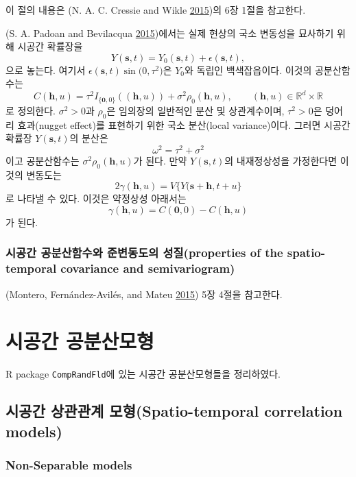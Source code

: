 \documentclass[b5paper,]{book}
\theoremstyle{definition}
\theoremstyle{definition}
\theoremstyle{definition}
\theoremstyle{remark}
\begin{document}
이 절의 내용은 (N. A. C. Cressie and Wikle
\protect\hyperlink{ref-Cressie2015}{2015})의 6장 1절을 참고한다.

(S. A. Padoan and Bevilacqua
\protect\hyperlink{ref-Padoan2015}{2015})에서는 실제 현상의 국소
변동성을 묘사하기 위해 시공간 확률장을
\[Y(\mathbf{s}, t)=Y_{0}(\mathbf{s},t) +\epsilon (\mathbf{s},t),\] 으로
놓는다. 여기서 \(\epsilon(\mathbf{s},t)\sin\mathcal(0,\tau^{2})\)은
\(Y_{0}\)와 독립인 백색잡읍이다. 이것의 공분산함수는
\[C(\mathbf{h},u)=\tau^{2}I_{\{\mathbf{0},0\}}((\mathbf{h},u))+\sigma^{2}\rho_{0}(\mathbf{h},u), \qquad{(\mathbf{h},u)\in\mathbb{R}^{d}\times \mathbb{R}}\]
로 정의한다. \(\sigma^{2}>0\)과 \(\rho_{0}\)은 임의장의 일반적인 분산 및
상관계수이며, \(\tau^{2}>0\)은 덩어리 효과(nugget effect)를 표현하기
위한 국소 분산(local variance)이다. 그러면 시공간 확률장
\(Y(\mathbf{s},t)\)의 분산은 \[\omega^{2}=\tau^{2}+\sigma^{2}\] 이고
공분산함수는 \(\sigma^{2}\rho_{0}(\mathbf{h},u)\)가 된다. 만약
\(Y(\mathbf{s},t)\)의 내재정상성을 가정한다면 이것의 변동도는
\[2\gamma(\mathbf{h},u)=V\{ Y(\mathbf{s}+\mathbf{h}, t+u\}\] 로 나타낼
수 있다. 이것은 약정상성 아래서는
\[\gamma(\mathbf{h},u)=C(\mathbf{0},0) - C(\mathbf{h}, u)\] 가 된다.

\subsection{시공간 공분산함수와 준변동도의 성질(properties of the
spatio-temporal covariance and
semivariogram)}\label{---properties-of-the-spatio-temporal-covariance-and-semivariogram}

(Montero, Fernández-Avilés, and Mateu
\protect\hyperlink{ref-Montero2015}{2015}) 5장 4절을 참고한다.

\chapter{시공간 공분산모형}\label{stcovmodel}

R package \texttt{CompRandFld}에 있는 시공간 공분산모형들을 정리하였다.

\section{시공간 상관관계 모형(Spatio-temporal correlation
models)}\label{--spatio-temporal-correlation-models}

\subsection{Non-Separable models}\label{non-separable-models}
\end{document}
